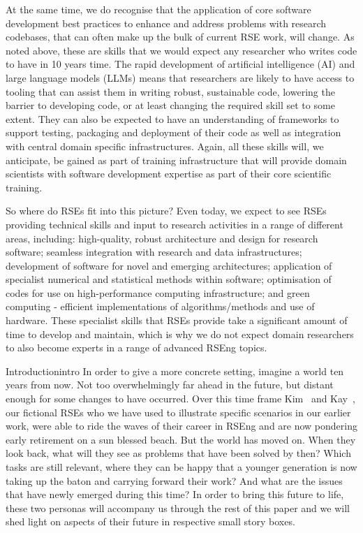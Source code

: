 \documentclass{eceasst}
\begin{document}
At the same time, we do recognise that the application of core software development best practices
to enhance and address problems with research codebases, that can often make up the bulk of
current RSE work, will change.
As noted above, these are skills that we would expect any researcher who writes code to have in 10 years time.
The rapid development of artificial intelligence (AI) and large language models
(LLMs) means that researchers are likely to have access to tooling that can assist
them in writing robust, sustainable code, lowering the barrier to developing code,
or at least changing the required skill set to some extent.
They can also be expected to have an understanding of frameworks to support testing, packaging and
deployment of their code as well as integration with central domain specific infrastructures.
Again, all these skills will, we anticipate, be gained as part of training infrastructure that will
provide domain scientists with software development expertise as part of their core scientific training.

So where do RSEs fit into this picture?
Even today, we expect to see RSEs providing technical skills and input to research activities in a range of different areas, including:
high-quality, robust architecture and design for research software;
seamless integration with research and data infrastructures;
development of software for novel and emerging architectures;
application of specialist numerical and statistical methods within software;
optimisation of codes for use on high-performance computing infrastructure;
and green computing - efficient implementations of algorithms/methods and use of hardware.
These specialist skills that RSEs provide take a significant amount of time to develop and maintain,
which is why we do not expect domain researchers to also become experts in a range of advanced RSEng topics.


\begin{story}{Introduction}{intro}
In order to give a more concrete setting, imagine a world ten years from now.
Not too overwhelmingly far ahead in the future, but distant enough for some changes to have occurred.
Over this time frame Kim~\cite{Anzt2021} and Kay~\cite{Goth2024},
our fictional RSEs who we have used to illustrate specific scenarios in our earlier work,
were able to ride the waves of their career in RSEng and are now pondering early retirement on a sun blessed beach.
But the world has moved on.
When they look back, what will they see as problems that have been solved by then?
Which tasks are still relevant, where they can be happy that a younger generation is now taking up the baton and carrying forward their work?
And what are the issues that have newly emerged during this time?
In order to bring this future to life, these two personas will accompany us through the rest of this paper and we will shed light on aspects
of their future in respective small story boxes.
\end{story}
\end{document}
